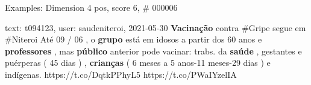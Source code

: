 \begin{frame}{Examples: Dimension 4 pos, score 6, \# 000006}
\footnotesize
\begin{exampleblock}{text: t094123, user: saudeniteroi, 2021-05-30}
\textbf{Vacinação} contra \#Gripe segue em \#Niteroi Até 09 / 06 , o 
\textbf{grupo} está em idosos a partir dos 60 anos e \textbf{professores} , mas 
\textbf{público} anterior pode vacinar: trabs. da \textbf{saúde} , gestantes e 
puérperas ( 45 dias ) , \textbf{crianças} ( 6 meses a 5 anos-11 meses-29 dias ) 
e indígenas. https://t.co/DqtkPPhyL5 https://t.co/PWaIYzelIA 
\end{exampleblock}
\end{frame}
